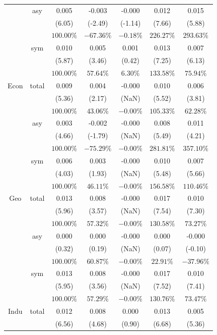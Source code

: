 \documentclass[
]{article}
\begin{document}
\begin{table}[H]
{\begin{tabular}{ccccccc}
   & asy & 0.005 & -0.003 & -0.000 & 0.012 & 0.015 \\ 
   &  & (6.05) & (-2.49) & (-1.14) & (7.66) & (5.88) \\ 
   &  & $100.00\%$ & $-67.36\%$ & $-0.18\%$ & $226.27\%$ & $293.63\%$ \\ 
   & sym & 0.010 & 0.005 & 0.001 & 0.013 & 0.007 \\ 
   &  & (5.87) & (3.46) & (0.42) & (7.25) & (6.13) \\ 
   &  & $100.00\%$ & $57.64\%$ & $6.30\%$ & $133.58\%$ & $75.94\%$ \\ 
   \hline 
Econ & total & 0.009 & 0.004 & -0.000 & 0.010 & 0.006 \\ 
   &  & (5.36) & (2.17) & (NaN) & (5.52) & (3.81) \\ 
   &  & $100.00\%$ & $43.06\%$ & $-0.00\%$ & $105.33\%$ & $62.28\%$ \\ 
   & asy & 0.003 & -0.002 & -0.000 & 0.008 & 0.011 \\ 
   &  & (4.66) & (-1.79) & (NaN) & (5.49) & (4.21) \\ 
   &  & $100.00\%$ & $-75.29\%$ & $-0.00\%$ & $281.81\%$ & $357.10\%$ \\ 
   & sym & 0.006 & 0.003 & -0.000 & 0.010 & 0.007 \\ 
   &  & (4.03) & (1.93) & (NaN) & (5.48) & (5.66) \\ 
   &  & $100.00\%$ & $46.11\%$ & $-0.00\%$ & $156.58\%$ & $110.46\%$ \\ 
   \hline 
Geo & total & 0.013 & 0.008 & -0.000 & 0.017 & 0.010 \\ 
   &  & (5.96) & (3.57) & (NaN) & (7.54) & (7.30) \\ 
   &  & $100.00\%$ & $57.32\%$ & $-0.00\%$ & $130.58\%$ & $73.27\%$ \\ 
   & asy & 0.000 & 0.000 & -0.000 & 0.000 & -0.000 \\ 
   &  & (0.32) & (0.19) & (NaN) & (0.07) & (-0.10) \\ 
   &  & $100.00\%$ & $60.87\%$ & $-0.00\%$ & $22.91\%$ & $-37.96\%$ \\ 
   & sym & 0.013 & 0.008 & -0.000 & 0.017 & 0.010 \\ 
   &  & (5.95) & (3.56) & (NaN) & (7.52) & (7.41) \\ 
   &  & $100.00\%$ & $57.29\%$ & $-0.00\%$ & $130.76\%$ & $73.47\%$ \\ 
   \hline 
Indu & total & 0.012 & 0.008 & 0.000 & 0.013 & 0.005 \\ 
   &  & (6.56) & (4.68) & (0.90) & (6.68) & (5.36) \\ 

\end{tabular}}
\end{table}
\end{document}
